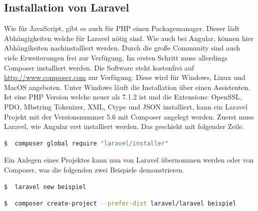 \subsection{Installation von Laravel}
Wie für JavaScript, gibt es auch für \ac{PHP} einen Packagemanager. Dieser lädt Abhängigkeiten welche für Laravel nötig sind. Wie auch bei Angular, können hier Abhängikeiten nachinstalliert werden. Durch die große Community sind auch viele Erweiterungen frei zur Verfügung. Im ersten Schritt muss allerdings Composer installiert werden. Die Software steht kostenfrei auf \url{http://www.composer.com} zur Verfügung. Diese wird für Windows, Linux und MacOS angeboten. \autocite{Composer.2018} Unter Windows läuft die Installation über einen Assistenten. Ist eine \ac{PHP} Version welche neuer als 7.1.2 ist und die Extensions: OpenSSL, \ac{PDO}, Mbstring Tokenizer, \ac{XML}, Ctype und \ac{JSON} installiert, kann ein Laravel Projekt mit der Versionsnummer 5.6  mit Composer angelegt werden. Zuerst muss Laravel, wie Angular erst installiert werden. Das geschieht mit folgender Zeile.

\begin{lstlisting}[language=sh, frame=single]
$  composer global require "laravel/installer"
\end{lstlisting}

Ein Anlegen eines Projektes kann nun von Laravel übernommen werden oder von Composer, was die folgenden zwei Beispiele demonstrieren.

\begin{lstlisting}[language=sh, frame=single]
$  laravel new beispiel
\end{lstlisting}

\begin{lstlisting}[language=sh, frame=single]
$  composer create-project --prefer-dist laravel/laravel beispiel
\end{lstlisting}

